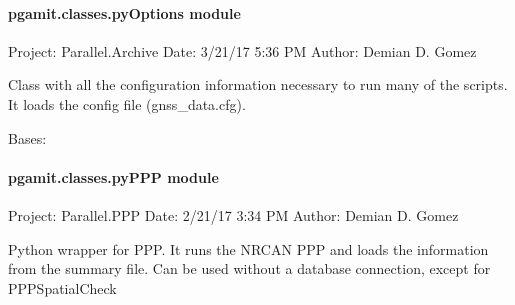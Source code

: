 \documentclass[letterpaper,10pt,english]{sphinxmanual}
\begin{document}
\paragraph{pgamit.classes.pyOptions module}
\label{\detokenize{pgamit.classes:module-pgamit.classes.pyOptions}}\label{\detokenize{pgamit.classes:pgamit-classes-pyoptions-module}}
\sphinxAtStartPar
Project: Parallel.Archive
Date: 3/21/17 5:36 PM
Author: Demian D. Gomez

\sphinxAtStartPar
Class with all the configuration information necessary to run many of the
scripts. It loads the config file (gnss\_data.cfg).

\begin{fulllineitems}
\label{\detokenize{pgamit.classes:pgamit.classes.pyOptions.ReadOptions}}
\pysigstartsignatures
\pysiglinewithargsret
{}
{}
{}
\pysigstopsignatures
\sphinxAtStartPar
Bases: 

\end{fulllineitems}



\paragraph{pgamit.classes.pyPPP module}
\label{\detokenize{pgamit.classes:module-pgamit.classes.pyPPP}}\label{\detokenize{pgamit.classes:pgamit-classes-pyppp-module}}
\sphinxAtStartPar
Project: Parallel.PPP
Date: 2/21/17 3:34 PM
Author: Demian D. Gomez

\sphinxAtStartPar
Python wrapper for PPP. It runs the NRCAN PPP and loads the information from
the summary file. Can be used without a database connection, except for
PPPSpatialCheck
\end{document}
